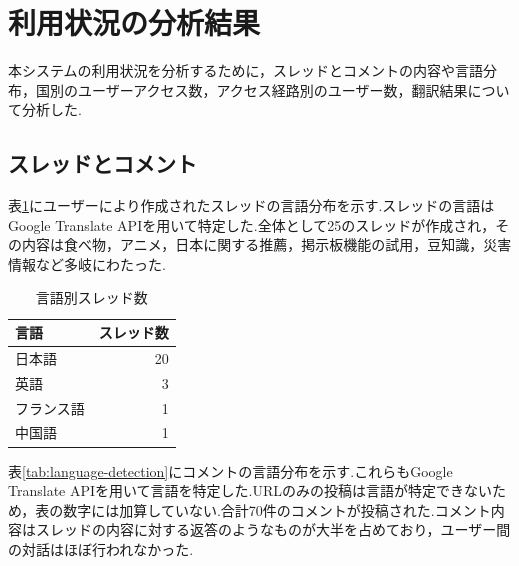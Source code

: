 \documentclass[b5paper,12pt,dvipdfmx]{jsreport}
\begin{document}
\section{利用状況の分析結果}

本システムの利用状況を分析するために，スレッドとコメントの内容や言語分布，国別のユーザーアクセス数，アクセス経路別のユーザー数，翻訳結果について分析した.

\subsection{スレッドとコメント}

表\ref{tab:thread-language}にユーザーにより作成されたスレッドの言語分布を示す.スレッドの言語はGoogle Translate APIを用いて特定した.全体として25のスレッドが作成され，その内容は食べ物，アニメ，日本に関する推薦，掲示板機能の試用，豆知識，災害情報など多岐にわたった.


\begin{table}[H]
    \centering
    \caption{言語別スレッド数}
    \label{tab:thread-language}
    \begin{tabular}{|l|r|}
        \hline
        \textbf{言語} & \textbf{スレッド数} \\ \hline
        日本語       & 20               \\
        英語         & 3                 \\
        フランス語    & 1                 \\
        中国語       & 1                 \\ \hline
    \end{tabular}
\end{table}

表\ref{tab:language-detection}にコメントの言語分布を示す.これらもGoogle Translate APIを用いて言語を特定した.URLのみの投稿は言語が特定できないため，表の数字には加算していない.合計70件のコメントが投稿された.コメント内容はスレッドの内容に対する返答のようなものが大半を占めており，ユーザー間の対話はほぼ行われなかった.
\end{document}
